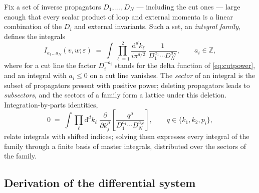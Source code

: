 \documentclass[11pt]{article}
\newcommand{\eps}{\varepsilon}
\newcommand{\dd}{\mathrm{d}}
\newcommand{\Z}{\mathbb{Z}}
\begin{document}
Fix a set of inverse propagators $D_1,\dots,D_N$ --- including the
cut ones --- large enough that every scalar product of loop and
external momenta is a linear combination of the $D_i$ and external
invariants.  Such a set, an \emph{integral family}, defines the
integrals
\begin{equation}
  I_{a_1\dots a_N}(v,w;\eps)
  \;=\; \int \prod_{\ell=1}^{2}\frac{\dd^d k_\ell}{i\pi^{d/2}}\;
  \frac{1}{D_1^{a_1}\cdots D_N^{a_N}},
  \qquad a_i \in \Z ,
  \label{eq:familyint}
\end{equation}
where for a cut line the factor $D_i^{-a_i}$ stands for the delta
function of \eqref{eq:cutpower}, and an integral
with $a_i \le 0$ on a cut line vanishes.  The \emph{sector} of an
integral is the subset of
propagators present with positive power; deleting propagators leads
to \emph{subsectors}, and the sectors of a family form a lattice
under this deletion.  Integration-by-parts identities,
\begin{equation}
  0 \;=\; \int \prod_\ell \dd^d k_\ell\;
  \frac{\partial}{\partial k_j^\mu}
  \left[\frac{q^\mu}{D_1^{a_1}\cdots D_N^{a_N}}\right],
  \qquad q \in \{k_1,k_2,p_i\},
\end{equation}
relate integrals with shifted indices; solving them expresses every
integral of the family through a finite basis of master integrals,
distributed over the sectors of the family.

\subsection{Derivation of the differential system}
\end{document}
